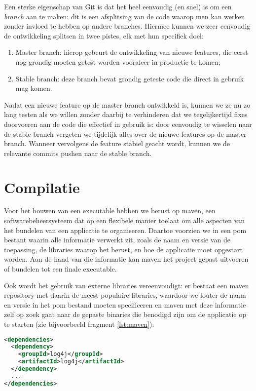 Een sterke eigenschap van Git is dat het heel eenvoudig (en snel) is om een \emph{branch} aan te maken: dit is een afsplitsing van de code waarop men kan werken zonder invloed te hebben op andere branches. Hiermee kunnen we zeer eenvoudig de ontwikkeling splitsen in twee pistes, elk met hun specifiek doel:
\begin{enumerate}
  \item Master branch: hierop gebeurt de ontwikkeling van nieuwe features, die eerst nog grondig moeten getest worden vooraleer in productie te komen;
  \item Stable branch: deze branch bevat grondig geteste code die direct in gebruik mag komen.
\end{enumerate}
Nadat een nieuwe feature op de master branch ontwikkeld is, kunnen we ze nu zo lang testen als we willen zonder daarbij te verhinderen dat we tegelijkertijd fixes doorvoeren aan de code die effectief in gebruik is: door eenvoudig te wisselen naar de stable branch vergeten we tijdelijk alles over de nieuwe features op de master branch. Wanneer vervolgens de feature stabiel geacht wordt, kunnen we de relevante commits pushen naar de stable branch.

\section{Compilatie}
\label{server:deployment:compilatie}

Voor het bouwen van een executable hebben we berust op \ac{maven}, een softwarebeheersysteem dat op een flexibele manier toelaat om alle aspecten van het bundelen van een applicatie te organiseren. Daartoe voorzien we in een \ac{pom} bestant waarin alle informatie verwerkt zit, zoals de naam en versie van de toepassing, de libraries waarop het berust, en hoe de applicatie moet opgestart worden. Aan de hand van die informatie kan \ac{maven} het project gepast uitvoeren of bundelen tot een finale executable.

Ook wordt het gebruik van externe libraries vereenvoudigt: er bestaat een \ac{maven} repository met daarin de meest populaire libraries, waardoor we louter de naam en versie in het \ac{pom} bestand moeten specificeren en \ac{maven} met deze informatie zelf op zoek gaat naar de gepaste binaries die benodigd zijn om de applicatie op te starten (zie bijvoorbeeld fragment \ref{lst:maven}).

\begin{lstlisting}[language=XML, float, caption=Inladen van externe libraries via Maven., label=lst:maven]
<dependencies>
  <dependency>
    <groupId>log4j</groupId>
    <artifactId>log4j</artifactId>
  </dependency>
  ...
</dependencies>
\end{lstlisting}

